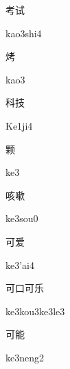 \begin{multicols*}{2}
\begin{verbete}{考试}
\begin{pronuncia}{kao3shi4}
\end{pronuncia}
\end{verbete}

\begin{verbete}[kao3]{烤}
\begin{pronuncia}{kao3}
\end{pronuncia}
\end{verbete}

\begin{verbete}[Ke1ji4]{科技}
\begin{pronuncia}{Ke1ji4}
\end{pronuncia}
\end{verbete}

\begin{verbete}[ke3]{颗}
\begin{pronuncia}{ke3}
\end{pronuncia}
\end{verbete}

\begin{verbete}[ke3sou0]{咳嗽}
\begin{pronuncia}{ke3sou0}
\end{pronuncia}
\end{verbete}

\begin{verbete}[ke3'ai4]{可爱}
\begin{pronuncia}{ke3'ai4}
\end{pronuncia}
\end{verbete}

\begin{verbete}[ke3kou3ke3le3]{可口可乐}
\begin{pronuncia}{ke3kou3ke3le3}
\end{pronuncia}
\end{verbete}

\begin{verbete}[ke3neng2]{可能}
\begin{pronuncia}{ke3neng2}
\end{pronuncia}
\end{verbete}


\end{multicols*}
